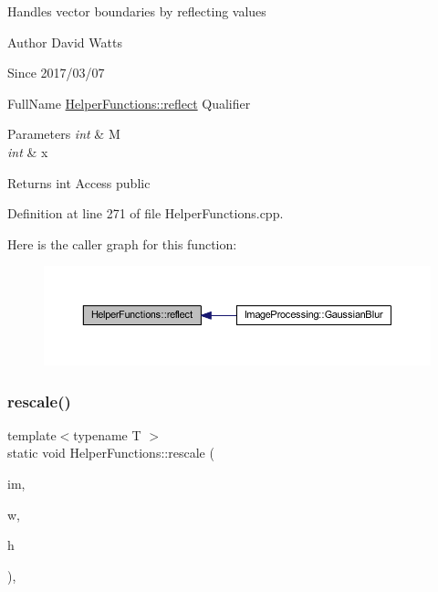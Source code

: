 Handles vector boundaries by reflecting values

\begin{DoxyAuthor}{Author}
David Watts 
\end{DoxyAuthor}
\begin{DoxySince}{Since}
2017/03/07
\end{DoxySince}
Full\+Name \hyperlink{class_helper_functions_af83ef83dc647e660335bf5564f5fdda7}{Helper\+Functions\+::reflect} Qualifier 
\begin{DoxyParams}{Parameters}
{\em int} & M \\
\hline
{\em int} & x \\
\hline
\end{DoxyParams}
\begin{DoxyReturn}{Returns}
int Access public 
\end{DoxyReturn}


Definition at line 271 of file Helper\+Functions.\+cpp.

Here is the caller graph for this function\+:
\nopagebreak
\begin{figure}[H]
\begin{center}
\leavevmode
\includegraphics[width=350pt]{class_helper_functions_af83ef83dc647e660335bf5564f5fdda7_icgraph}
\end{center}
\end{figure}
\mbox{\label{class_helper_functions_a7807daf795fa0056e924f191be8abaf9}} 
\subsubsection{\texorpdfstring{rescale()}{rescale()}}
{\footnotesize\ttfamily template$<$typename T $>$ \\
static void Helper\+Functions\+::rescale (\begin{DoxyParamCaption}\item[{T $\ast$}]{im,  }\item[{int}]{w,  }\item[{int}]{h }\end{DoxyParamCaption})\hspace{0.3cm}{\ttfamily [inline]}, {\ttfamily [static]}}

